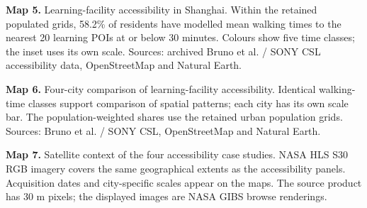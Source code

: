 \noindent\textbf{Map 5.} Learning-facility accessibility in Shanghai. Within the retained populated grids, 58.2\% of residents have modelled mean walking times to the nearest 20 learning POIs at or below 30 minutes. Colours show five time classes; the inset uses its own scale. Sources: archived Bruno et al. / SONY CSL accessibility data, OpenStreetMap and Natural Earth.\par\medskip
\noindent\textbf{Map 6.} Four-city comparison of learning-facility accessibility. Identical walking-time classes support comparison of spatial patterns; each city has its own scale bar. The population-weighted shares use the retained urban population grids. Sources: Bruno et al. / SONY CSL, OpenStreetMap and Natural Earth.\par\medskip
\noindent\textbf{Map 7.} Satellite context of the four accessibility case studies. NASA HLS S30 RGB imagery covers the same geographical extents as the accessibility panels. Acquisition dates and city-specific scales appear on the maps. The source product has 30 m pixels; the displayed images are NASA GIBS browse renderings.\par\medskip
